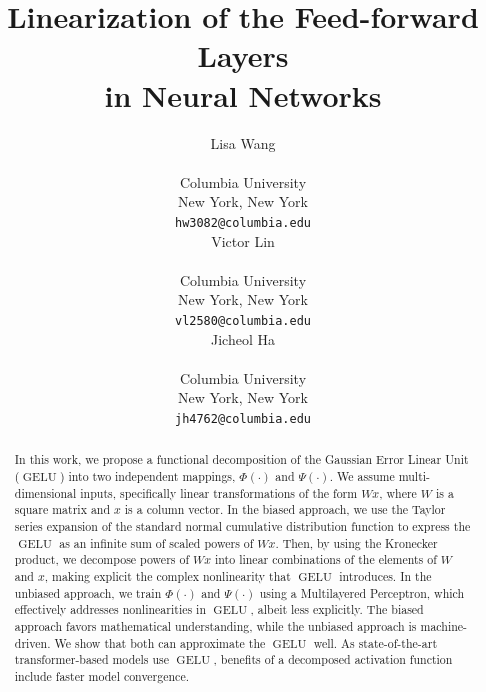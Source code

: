 \documentclass{article}
\title{Linearization of the Feed-forward Layers\\ in Neural Networks}
\author{
  Lisa Wang \\
   \\
  Columbia University \\
  New York, New York \\
  \texttt{hw3082@columbia.edu} \\
    \And
  Victor Lin \\
   \\
  Columbia University \\
  New York, New York \\
  \texttt{vl2580@columbia.edu} \\
    \And
  Jicheol Ha \\
   \\
  Columbia University \\
  New York, New York\\
  \texttt{jh4762@columbia.edu}
}
\begin{document}
\maketitle
\vspace{-0.5cm}
\begin{abstract}
In this work, we propose a functional decomposition of the Gaussian Error Linear Unit ($\operatorname{GELU}$) into two independent mappings, $\Phi(\cdot)$ and $\Psi(\cdot)$. We assume multi-dimensional inputs, specifically linear transformations of the form $Wx$, where $W$ is a square matrix and $x$ is a column vector. In the biased approach, we use the Taylor series expansion of the standard normal cumulative distribution function to  express the $\operatorname{GELU}$ as an infinite sum of scaled powers of $Wx$. Then, by using the Kronecker product, we decompose powers of $Wx$ into linear combinations of the elements of $W$ and $x$, making explicit the complex nonlinearity that $\operatorname{GELU}$ introduces. In the unbiased approach, we train $\Phi(\cdot)$ and $\Psi(\cdot)$ using a Multilayered Perceptron, which effectively addresses nonlinearities in $\operatorname{GELU}$, albeit less explicitly. The biased approach favors mathematical understanding, while the unbiased approach is machine-driven. We show that both can approximate the $\operatorname{GELU}$ well. As state-of-the-art transformer-based models use $\operatorname{GELU}$, benefits of a decomposed activation function include faster model convergence.
\end{abstract}

\end{document}
